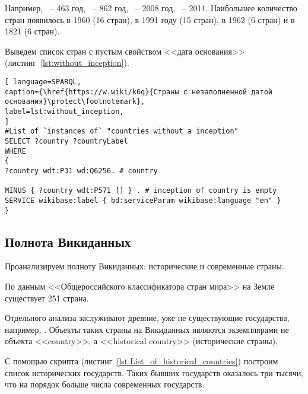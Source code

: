 
Например,  ~-- 463 год,  ~-- 862 год,  ~-- 2008 год,  ~-- 2011. 
Наибольшее количество стран появилось в 1960 (16 стран), в 1991 году (15 стран), в 1962 (6 стран) и в 1821 (6 стран).

Выведем список стран с пустым свойством <<дата основания>> (листинг~\ref{lst:without_inception}).

\begin{lstlisting}[ language=SPARQL, 
caption={\href{https://w.wiki/k6q}{Страны с незаполненной датой основания}\protect\footnotemark},
label=lst:without_inception, 
]
#List of `instances of` "countries without a inception" 
SELECT ?country ?countryLabel 
WHERE
{
?country wdt:P31 wd:Q6256. # country

MINUS { ?country wdt:P571 [] } . # inception of country is empty
SERVICE wikibase:label { bd:serviceParam wikibase:language "en" }
}
\end{lstlisting}


\subsection{Полнота Викиданных}

Проанализируем полноту Викиданных: исторические и современные страны..

По данным <<Общероссийского классификатора стран мира>>\cite{oksm} на Земле существует 251 страна.

Отдельного анализа заслуживают древние, уже не существующие государства, например, . Объекты таких страны на Викиданных являются экземплярами не объекта <<country>>, а  <<historical country>> (исторические страны). 

С помощью скрипта (листинг~\ref{lst:List_of_historical_countries}) построим список исторических государств. Таких бывших государств оказалось три тысячи, что на порядок больше числа современных государств.

